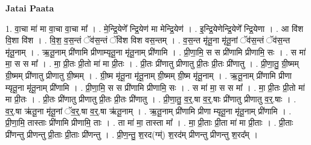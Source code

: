 \documentclass[17pt]{extarticle}
\begin{document}
\textbf{Jatai Paata} \newline

1. वा॒चा मा॑ मा वा॒चा वा॒चा मा᳚ । . मे॒न्द्रि॒येणे᳚ न्द्रि॒येण॑ मा मेन्द्रि॒येण॑ । . इ॒न्द्रि॒येणेन्द्रि॒येणे᳚ न्द्रि॒येणा । . आ वि॑श वि॒शा वि॑श । . वि॒श॒ व॒स॒न्तं ॅव॑स॒न्तं ॅवि॑श विश वस॒न्तम् । . व॒स॒न्त मृ॑तू॒ना मृ॑तू॒नां ॅव॑स॒न्तं ॅव॑स॒न्त मृ॑तू॒नाम् । . ऋ॒तू॒नाम् प्री॑णामि प्रीणाम्यृतू॒ना मृ॑तू॒नाम् प्री॑णामि । . प्री॒णा॒मि॒ स स प्री॑णामि प्रीणामि॒ सः । . स मा॑ मा॒ स स मा᳚ । . मा॒ प्री॒तः प्री॒तो मा॑ मा प्री॒तः । . प्री॒तः प्री॑णातु प्रीणातु प्री॒तः प्री॒तः प्री॑णातु । . प्री॒णा॒तु॒ ग्री॒ष्मम् ग्री॒ष्मम् प्री॑णातु प्रीणातु ग्री॒ष्मम् । . ग्री॒ष्म मृ॑तू॒ना मृ॑तू॒नाम् ग्री॒ष्मम् ग्री॒ष्म मृ॑तू॒नाम् । . ऋ॒तू॒नाम् प्री॑णामि प्रीणा म्यृतू॒ना मृ॑तू॒नाम् प्री॑णामि । . प्री॒णा॒मि॒ स स प्री॑णामि प्रीणामि॒ सः । . स मा॑ मा॒ स स मा᳚ । . मा॒ प्री॒तः प्री॒तो मा॑ मा प्री॒तः । . प्री॒तः प्री॑णातु प्रीणातु प्री॒तः प्री॒तः प्री॑णातु । . प्री॒णा॒तु॒ व॒र्॒.षा व॒र्॒.षाः प्री॑णातु प्रीणातु व॒र्॒.षाः । . व॒र्॒.षा ऋ॑तू॒ना मृ॑तू॒नां ॅव॒र्॒.षा व॒र्॒.षा ऋ॑तू॒नाम् । . ऋ॒तू॒नाम् प्री॑णामि प्रीणा म्यृतू॒ना मृ॑तू॒नाम् प्री॑णामि । . प्री॒णा॒मि॒ तास्ताः प्री॑णामि प्रीणामि॒ ताः । . ता मा॑ मा॒ तास्ता मा᳚ । . मा॒ प्री॒ताः प्री॒ता मा॑ मा प्री॒ताः । . प्री॒ताः प्री॑णन्तु प्रीणन्तु प्री॒ताः प्री॒ताः प्री॑णन्तु । . प्री॒ण॒न्तु॒ श॒रद(ग्म्॑) श॒रद॑म् प्रीणन्तु प्रीणन्तु श॒रद᳚म् । \newline
\end{document}
